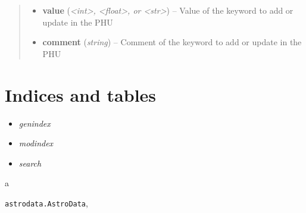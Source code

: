 \documentclass[letterpaper,10pt,english]{sphinxmanual}
\begin{document}
\begin{fulllineitems}
\begin{fulllineitems}
\begin{quote}
\begin{description}
\begin{itemize}
\item {} 
\textbf{value} (\emph{\textless{}int\textgreater{}, \textless{}float\textgreater{}, or \textless{}str\textgreater{}}) -- Value of the keyword to add or update in the PHU

\item {} 
\textbf{comment} (\emph{string}) -- Comment of the keyword to add or update in the PHU

\end{itemize}

\end{description}\end{quote}

\end{fulllineitems}


\end{fulllineitems}



\chapter{Indices and tables}
\label{index:indices-and-tables}\begin{itemize}
\item {} 
\emph{genindex}

\item {} 
\emph{modindex}

\item {} 
\emph{search}

\end{itemize}


\renewcommand{\indexname}{Python Module Index}
\begin{theindex}
\def\bigletter#1{{\Large\sffamily#1}\nopagebreak\vspace{1mm}}
\bigletter{a}
\item {\texttt{astrodata.AstroData}}, \pageref{astro_class:module-astrodata.AstroData}
\end{theindex}

\renewcommand{\indexname}{Index}
\printindex
\end{document}
